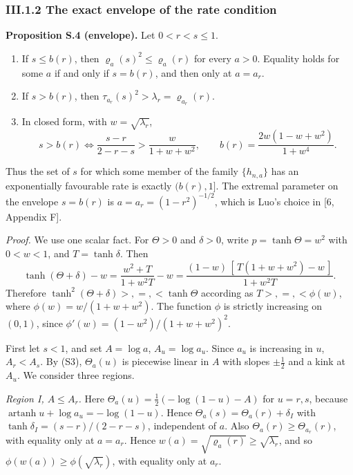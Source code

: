 \documentclass[
  british,
  10pt,
]{article}
\providecommand{\tightlist}{%
  \setlength{\itemsep}{0pt}\setlength{\parskip}{0pt}}
\begin{document}
\subsubsection{III.1.2 The exact envelope of the rate
condition}\label{iii.1.2-the-exact-envelope-of-the-rate-condition}

\textbf{Proposition S.4 (envelope).} Let \(0<r<s\le1\).

\begin{enumerate}
\def\labelenumi{\arabic{enumi}.}
\tightlist
\item
  If \(s\le b(r)\), then \(\varrho_a(s)^2\le\varrho_a(r)\) for every
  \(a>0\). Equality holds for some \(a\) if and only if \(s=b(r)\), and
  then only at \(a=a_r\).
\item
  If \(s>b(r)\), then \(\tau_{a_r}(s)^2>\lambda_r=\varrho_{a_r}(r)\).
\item
  In closed form, with \(w=\sqrt{\lambda_r}\), \[
  \boxed{\;
  s>b(r)\iff\frac{s-r}{2-r-s}>\frac{w}{1+w+w^2},
  \qquad
  b(r)=\frac{2w(1-w+w^2)}{1+w^4}.
  \;}
  \tag{S4}
  \]
\end{enumerate}

Thus the set of \(s\) for which some member of the family
\(\{h_{n,a}\}\) has an exponentially favourable rate is exactly
\((b(r),1]\). The extremal parameter on the envelope \(s=b(r)\) is
\(a=a_r=(1-r^2)^{-1/2}\), which is Luo's choice in {[}6, Appendix F{]}.

\emph{Proof.} We use one scalar fact. For \(\Theta>0\) and \(\delta>0\),
write \(p=\tanh\Theta=w^2\) with \(0<w<1\), and \(T=\tanh\delta\). Then
\[
\tanh(\Theta+\delta)-w=\frac{w^2+T}{1+w^2T}-w
=\frac{(1-w)\,[\,T(1+w+w^2)-w\,]}{1+w^2T}.
\] Therefore \(\tanh^2(\Theta+\delta)>,=,<\tanh\Theta\) according as
\(T>,=,<\phi(w)\), where \(\phi(w)=w/(1+w+w^2)\). The function \(\phi\)
is strictly increasing on \((0,1)\), since
\(\phi'(w)=(1-w^2)/(1+w+w^2)^2\).

First let \(s<1\), and set \(A=\log a\), \(A_u=\log a_u\). Since \(a_u\)
is increasing in \(u\), \(A_r<A_s\). By (S3), \(\Theta_a(u)\) is
piecewise linear in \(A\) with slopes \(\pm\frac12\) and a kink at
\(A_u\). We consider three regions.

\emph{Region I, \(A\le A_r\).} Here
\(\Theta_a(u)=\frac12(-\log(1-u)-A)\) for \(u=r,s\), because
\(\operatorname{artanh}u+\log a_u=-\log(1-u)\). Hence
\(\Theta_a(s)=\Theta_a(r)+\delta_I\) with
\(\tanh\delta_I=(s-r)/(2-r-s)\), independent of \(a\). Also
\(\Theta_a(r)\ge\Theta_{a_r}(r)\), with equality only at \(a=a_r\).
Hence \(w(a)=\sqrt{\varrho_a(r)}\ge\sqrt{\lambda_r}\), and so
\(\phi(w(a))\ge\phi(\sqrt{\lambda_r})\), with equality only at \(a_r\).
\end{document}
